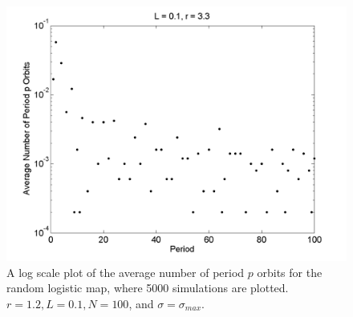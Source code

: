 \begin{figure}[H]\linespread{1}
\caption[Log scale plot of the average number of period $p$ orbits for the random logistic
map, $\sigma=\sigma_{max}$ and $r=3.3$]{A log scale plot of the average number of period $p$ orbits for the random logistic
map, where 5000 simulations are plotted. $r=1.2, L=0.1, N = 100$, and $\sigma=\sigma_{max}$.}\label{fig:rloghistlog}
	\begin{center}
\includegraphics[scale=0.55]{figs/rlog_hist_L_01_r_33_sims_5000semilogy.png}\hfill		\end{center}
\end{figure}
	
